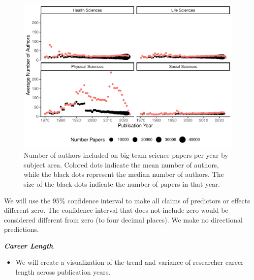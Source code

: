 \documentclass[
  man]{apa7}
\providecommand{\tightlist}{%
  \setlength{\itemsep}{0pt}\setlength{\parskip}{0pt}}
\begin{document}
\begin{figure}
\centering
\includegraphics{manuscript_scopus_files/figure-latex/fig-author-year-1.pdf}
\caption{\label{fig:fig-author-year}Number of authors included on big-team science papers per year by subject area. Colored dots indicate the mean number of authors, while the black dots represent the median number of authors. The size of the black dots indicate the number of papers in that year.}
\end{figure}

We will use the 95\% confidence interval to make all claims of predictors
or effects different zero. The confidence interval that does not include
zero would be considered different from zero (to four decimal places).
We make no directional predictions.

\textbf{\emph{Career Length}}.

\begin{itemize}
\tightlist
\item
  We will create a visualization of the trend and variance of
  researcher career length across publication years.
\end{itemize}
\end{document}
